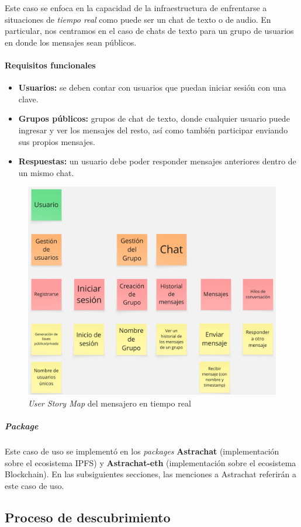Este caso se enfoca en la capacidad de la infraestructura de enfrentarse a situaciones de \textit{tiempo real} como puede ser un chat de texto o de audio. En particular, nos centramos en el caso de chats de texto para un grupo de usuarios en donde los mensajes sean públicos.

\paragraph{Requisitos funcionales}

\begin{itemize}
    \item \textbf{Usuarios:} se deben contar con usuarios que puedan iniciar sesión con una clave.
    \item \textbf{Grupos públicos:} grupos de chat de texto, donde cualquier usuario puede ingresar y ver los mensajes del resto, así como también participar enviando sus propios mensajes.
    \item \textbf{Respuestas:} un usuario debe poder responder mensajes anteriores dentro de un mismo chat.
\end{itemize}

\begin{figure}[H]
    \centering
    \includegraphics[width=0.5\linewidth]{img/usm-mensajero.jpg}
    \caption{\textit{User Story Map} del mensajero en tiempo real}
    \label{fig:enter-label}
\end{figure}

\subparagraph{Package}

Este caso de uso se implementó en los \textit{packages} \textbf{Astrachat}\cite{astrachat-ipfs} (implementación sobre el ecosistema IPFS) y \textbf{Astrachat-eth}\cite{astrachat-eth} (implementación sobre el ecosistema Blockchain). En las subsiguientes secciones, las menciones a Astrachat referirán a este caso de uso.

\subsection{Proceso de descubrimiento}

